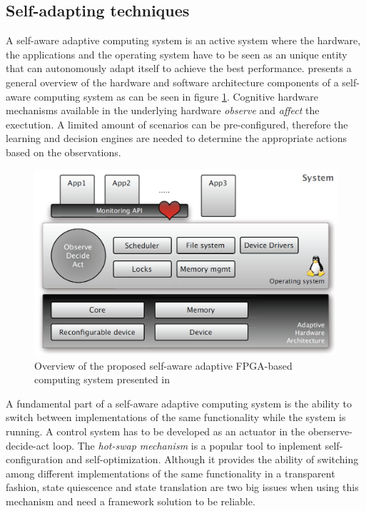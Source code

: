 \subsection{Self-adapting techniques}
\label{sec:selfadapting}

A self-aware adaptive computing system is an active system where the hardware, the applications and the operating system have to be seen as an unique entity that can autonomously adapt itself to achieve the best performance. \cite{selfaware} presents a general overview of the hardware and software architecture components of a self-aware computing system as can be seen in figure \ref{fig:selfaware}. Cognitive hardware mechanisms available in the underlying hardware \emph{observe} and \emph{affect} the exectution. A limited amount of scenarios can be pre-configured, therefore the learning and decision engines are needed to determine the appropriate actions based on the observations. 

\begin{figure}[htb]%
\includegraphics[width=\columnwidth]{Pictures/self-aware.PNG}%
\caption{Overview of the proposed self-aware adaptive FPGA-based computing system presented in \cite{selfaware}}%
\label{fig:selfaware}%
\end{figure}
A fundamental part of a self-aware adaptive computing system is the ability to switch between implementations of the same functionality while the system is running. A control system has to be developed as an actuator in the oberserve-decide-act loop. The \emph{hot-swap mechanism} is a popular tool to inplement self-configuration and self-optimization. Although it provides the ability of switching among different implementations of the same functionality in a transparent fashion, state quiescence and state translation are two big issues when using this mechanism and need a framework solution to be reliable. 

